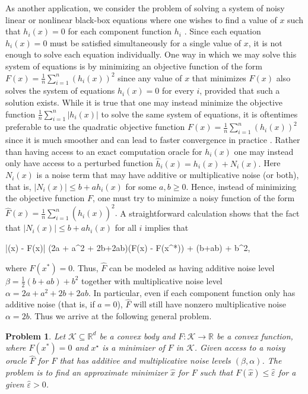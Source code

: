 \documentclass[final,12pt]{colt2018} %
\newtheorem{problem}{Problem}
\def \be{\begin{equs}}
\def \ee{\end{equs}}
\begin{document}
{As another application, we consider the problem of solving a system of noisy linear or nonlinear black-box equations where one wishes to find a value of $x$ such that $h_i(x)=0$ for each component function $h_i$ \citep{chen2015stochastic}. 
%  
 Since each equation $h_i(x)=0$  must be satisfied simultaneously for a single value of $x$, it is not enough to solve each equation individually.  
One way in which we may solve this system of equations is by minimizing an objective function of the form
$F(x) = \frac{1}{n} \sum_{i=1}^n(h_i(x))^2$
%
since any value of $x$ that minimizes $F(x)$ also solves the system of equations $h_i(x)=0$ for every $i$, provided that such a solution exists.  While it is true that one may instead minimize the objective function  $\frac{1}{n} \sum_{i=1}^n |h_i(x)|$ to solve the same system of equations, it is oftentimes preferable to use the quadratic objective function  $F(x) = \frac{1}{n} \sum_{i=1}^n(h_i(x))^2$ since it is much smoother and can lead to faster convergence in practice \citep{chen2015stochastic}.
%
Rather than having access to an exact computation oracle for $h_i(x)$ one may instead only have access to a perturbed function $\hat{h}_i(x) = h_i(x) + N_i(x).$
%
  Here $N_i(x)$ is a noise term that may have additive or multiplicative noise (or both), that is, $|N_i(x)| \leq b + ah_i(x)$ for some $a,b \geq 0$. 
Hence, instead of minimizing the objective function $F$, one must try to minimize a noisy function of the form 
%
$\hat{F}(x) =\frac{1}{n} \sum_{i=1}^n(\hat{h}_i(x))^2.$
A straightforward calculation shows that the fact that $|N_i(x)| \leq b + ah_i(x)$ for all $i$ implies that 
%
\be
|(x) - F(x)| 
 \leq  (2a + a^2 + 2b+2ab)(F(x) - F(x^{*})) + (b+ab) + b^2,
\ee
%
where $F(x^{*}) = 0$.  Thus, $\hat{F}$ can be modeled as having additive noise  level $\beta = \frac{1}{2}(b+ab) + b^2$ together with multiplicative noise  level $\alpha = 2a + a^2 + 2b+2ab$. 
  In particular, even if each component function only has additive noise (that is, if $a=0$), $\hat{F}$ will still have nonzero multiplicative noise $\alpha = 2b$.
%
Thus we arrive at  the following  general problem.
%
\begin{problem}\label{problem1}
Let $\mathcal{K} \subseteq \mathbb{R}^d$ be a convex body and $F: \mathcal{K} \rightarrow \mathbb{R}$ be a  convex function, where $F(x^{*})=0$
%
and $x^\star$ is a minimizer of $F$ in $\mathcal{K}$.
%
Given access to a noisy oracle $\hat{F}$ for $F$ that has additive and multiplicative noise  levels $(\beta,\alpha)$.  
%
The problem is to find an approximate minimizer $\hat{x}$ for $F$ such that $F(\hat{x}) \leq \hat{\varepsilon}$ for a given $\hat{\varepsilon} >0$.
\end{problem}
%

}
\end{document}
